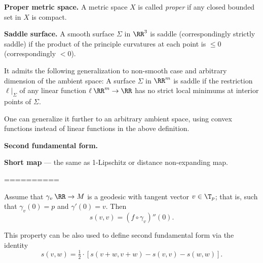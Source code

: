 \begin{description}
\item{\bf Proper metric space.}
\label{Proper metric space} 
A metric space $X$ is called \emph{proper} if any closed bounded set in $X$ is compact.




\item{\bf Saddle surface.}\label{Saddle surface} A smooth surface $\Sigma$ in $\RR^3$ is saddle 
(correspondingly strictly saddle) 
if the product of the principle curvatures at each point is $\le 0$ (correspondingly $<0$).

It admits the following generalization to non-smooth case and arbitrary dimension of the ambient space:
A surface $\Sigma$ in $\RR^m$ is saddle if the restriction $\ell|_\Sigma$ of any linear function $\ell\:\RR^m\to\RR$ has no strict local minimums at interior points of $\Sigma$.

One can generalize it further to an arbitrary ambient space, using convex functions instead of linear functions in the above definition.




\item{\bf Second fundamental form.}\label{Second fundamental form} 


\item{\bf Short map}\label{Short map} --- the same as 1-Lipschitz 
or distance non-expanding map.

==========

Assume that $\gamma_v\:\RR\to M$ is a geodesic with tangent vector $v\in \T_p$;
that is, such that $\gamma_v(0)=p$ and $\gamma'(0)=v$.
Then 
\[s(v,v)=(f\circ\gamma_v)''(0).\]

This property can be also used to define second fundamental form via the identity
$$s(v,w)=\tfrac 12\cdot[s(v+w,v+w)-s(v,v)-s(w,w)].$$


\end{description}
